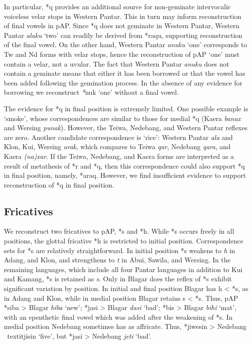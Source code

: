In particular, *q provides an additional source for non-geminate intervocalic voiceless velar stops in Western Pantar. This in turn may inform reconstruction of final vowels in pAP. Since *q does not geminate in Western Pantar, Western Pantar \textit{alaku} `two' can readily be derived from *raqu, supporting reconstruction of the final vowel. On the other hand, Western Pantar \textit{anuku} `one' corresponds to Tw and Nd forms with velar stops, hence the reconstruction of pAP `one' must contain a velar, not a uvular. The fact that Western Pantar \textit{anuku }does not contain a geminate means that either it has been borrowed or that the vowel has been added following the gemination process. In the absence of any evidence for borrowing we reconstruct \textit{*}nuk `one' without a final vowel.

The evidence for *q in final position is extremely limited. One possible example is `smoke', whose correspondences are similar to those for medial *q (Kaera \textit{banax }and Wersing \textit{punak}). However, the Teiwa, Nedebang, and Western Pantar reflexes are zero. Another candidate correspondence is `rice': Western Pantar \textit{ala} and Klon, Kui, Wersing \textit{arak}, which compares to Teiwa \textit{qar}, Nedebang \textit{qara}, and Kaera \textit{(na)xar}. If the Teiwa, Nedebang, and Kaera forms are interpreted as a result of metathesis of *r and *q, then this correspondence could also support *q in final position, namely, *araq. However, we find insufficient evidence to support reconstruction of *q in final position.

\subsection{ Fricatives}
We reconstruct two fricatives to pAP, *s and *h. While *s occurs freely in all positions, the glottal fricative *h is restricted to initial position. Correspondence sets for *s are relatively straightforward. In initial position *s weakens to \textit{h} in Adang, and Klon, and strengthens to \textit{t} in Abui, Sawila, and Wersing. In the remaining languages, which include all four Pantar languages in addition to Kui and Kamang, *s is retained as \textit{s}. Only in Blagar does the reflex of *s exhibit significant variation by position. In initial and final position Blagar has h {\textless} *s, as in Adang and Klon, while in medial position Blagar retains s {\textless} *s. Thus, pAP *siba {\textgreater} Blagar \textit{hiba }`new'; *jasi {\textgreater} Blagar \textit{d{\textyogh}asi }`bad'; *bis {\textgreater} Blagar \textit{bihi} `mat', with an epenthetic final vowel which was added after the weakening of *s. In medial position Nedebang sometimes has as affricate. Thus, *jiwesin {\textgreater} Nedebang \
textit{jisin }`five', but *jasi {\textgreater} Nedebang \textit{jet{\textesh}i} `bad'.

